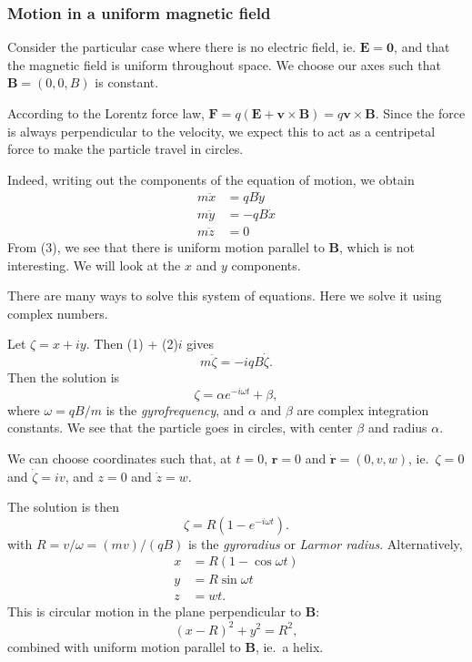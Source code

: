 \documentclass[a4paper]{article}
\begin{document}
\subsubsection*{Motion in a uniform magnetic field}
Consider the particular case where there is no electric field, ie. $\mathbf{E} = \mathbf{0}$, and that the magnetic field is uniform throughout space. We choose our axes such that $\mathbf{B} = (0, 0, B)$ is constant.

According to the Lorentz force law, $\mathbf{F} = q(\mathbf{E} + \mathbf{v}\times \mathbf{B}) = q\mathbf{v}\times \mathbf{B}$. Since the force is always perpendicular to the velocity, we expect this to act as a centripetal force to make the particle travel in circles.

Indeed, writing out the components of the equation of motion, we obtain
\begin{align*}
  m\ddot{x} &= qB\dot{y}\tag{1}\\
  m\ddot{y} &= -qB\dot{x}\tag{2}\\
  m\ddot{z} &= 0\tag{3}
\end{align*}
From (3), we see that there is uniform motion parallel to $\mathbf{B}$, which is not interesting. We will look at the $x$ and $y$ components.

There are many ways to solve this system of equations. Here we solve it using complex numbers.

Let $\zeta = x + iy$. Then (1) + (2)$i$ gives
\[
  m\ddot{\zeta} = -iqB\dot{\zeta}.
\]
Then the solution is
\[
  \zeta = \alpha e^{-i\omega t} + \beta,
\]
where $\omega = qB/m$ is the \emph{gyrofrequency}, and $\alpha$ and $\beta$ are complex integration constants. We see that the particle goes in circles, with center $\beta$ and radius $\alpha$.

We can choose coordinates such that, at $t = 0$, $\mathbf{r} = 0$ and $\dot{\mathbf{r}} = (0, v, w)$, ie.~$\zeta = 0$ and $\dot{\zeta} = iv$, and $z = 0$ and $\dot{z} = w$.

The solution is then
\[
  \zeta = R(1 - e^{-i\omega t}).
\]
with $R = v/\omega = (mv)/(qB)$ is the \emph{gyroradius} or \emph{Larmor radius}. Alternatively,
\begin{align*}
  x &= R(1 - \cos \omega t)\\
  y &= R\sin \omega t\\
  z &= wt.
\end{align*}
This is circular motion in the plane perpendicular to $\mathbf{B}$:
\[
  (x - R)^2 + y^2 = R^2,
\]
combined with uniform motion parallel to $\mathbf{B}$, ie.~a helix.
\end{document}

